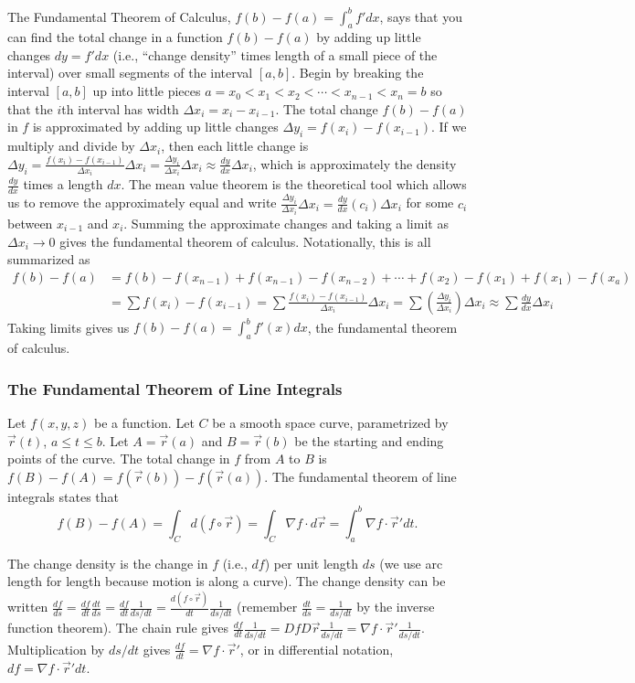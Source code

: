 The Fundamental Theorem of Calculus, $f(b)-f(a)=\int_a^b f' dx$, says
that you can find the total change in a function $f(b)-f(a)$ by adding
up little changes $dy=f'dx$ (i.e., ``change density'' times length of
a small piece of the interval) over small segments of the interval
$[a,b]$.  Begin by breaking the interval {$[a,b]$} up into little
pieces {$a=x_0<x_1<x_2<\cdots <x_{n-1}<x_n=b $} so that the $i$th interval
has width $\Delta x_i = x_i-x_{i-1}$. The total change {$f(b)-f(a)$} in $f$
is approximated by adding up little changes $\Delta
y_i=f(x_i)-f(x_{i-1})$. If we multiply and divide by $\Delta x_i$, then
each little change is $\Delta y_i=\frac{f(x_i)-f(x_{i-1})}{\Delta x_i}\Delta x_i =
\frac{\Delta y_i}{\Delta x_i}\Delta x_i \approx \frac{dy}{dx}\Delta x_i$, which is approximately
the density $\frac{dy}{dx}$ times a length $dx$. The mean value
theorem is the theoretical tool which allows us to remove the
approximately equal and write $\frac{\Delta y_i}{\Delta x_i}\Delta x_i =
\frac{dy}{dx}(c_i)\Delta x_i$ for some $c_i$ between $x_{i-1}$ and $x_i$.
Summing the approximate changes and taking a limit as $\Delta x_i\to 0$ gives
the fundamental theorem of calculus. Notationally, this is all
summarized as
\begin{align*}
f(b)-f(a) 
&= f(b)-f(x_{n-1}) + f(x_{n-1})-f(x_{n-2})+\cdots + f(x_{2})-f(x_{1})+
f(x_{1})-f(x_{a}) \\
&= \sum f(x_i) - f(x_{i-1}) 
= \sum\frac{f(x_i) - f(x_{i-1})}{ \Delta x_i}\Delta x_i  
= \sum\left(\frac{\Delta y_i}{ \Delta x_i}\right)\Delta x_i  
\approx \sum\frac{dy}{ dx}\Delta x_i 
\end{align*}
Taking limits gives us {$ f(b)-f(a) = \int_a^b f'(x)dx $}, the
fundamental theorem of calculus. 

\subsubsection{The Fundamental Theorem of Line Integrals}
Let {$ f(x,y,z) $} be a function. Let $C$ be a smooth space curve,
parametrized by {$ \vec r(t)$, $a\leq t\leq b $}. Let {$ A=\vec r(a) $} and {$
B=\vec r(b) $} be the starting and ending points of the curve. The total
change in {$ f $} from {$ A $} to {$ B $} is $f(B)-f(A) = f(\vec
r(b))-f(\vec r(a))$.  The fundamental theorem of line integrals states
that 
$$ f(B)-f(A) = \int_C d(f\circ \vec r) = \int_C \nabla f\cdot d\vec r = \int_a^b \nabla f \cdot \vec
r' dt. $$ 

The change density is the change in $f$ (i.e., $df$) per unit length
$ds$ (we use arc length for length because motion is along a
curve). The change density can be written $\frac{d f}{d s} = \frac
{df}{dt} \frac{dt}{ds}=\frac {df}{dt} \frac{1}{ds/dt}=\frac{d(f\circ \vec
  r)}{dt}\frac{1}{ds/dt}$ (remember $\frac {dt}{ds}=\frac{1}{ds/dt}$
by the inverse function theorem). The chain rule gives
$\frac{df}{dt}\frac 1 {ds/dt} = Df D\vec r \frac{1}{ds/dt} = \nabla f \cdot
\vec r' \frac{1}{ds/dt}$. Multiplication by $ds/dt$ gives
$\frac{df}{dt} = \nabla f \cdot \vec r'$, or in differential notation, $df = \nabla
f \cdot \vec r' dt$.

